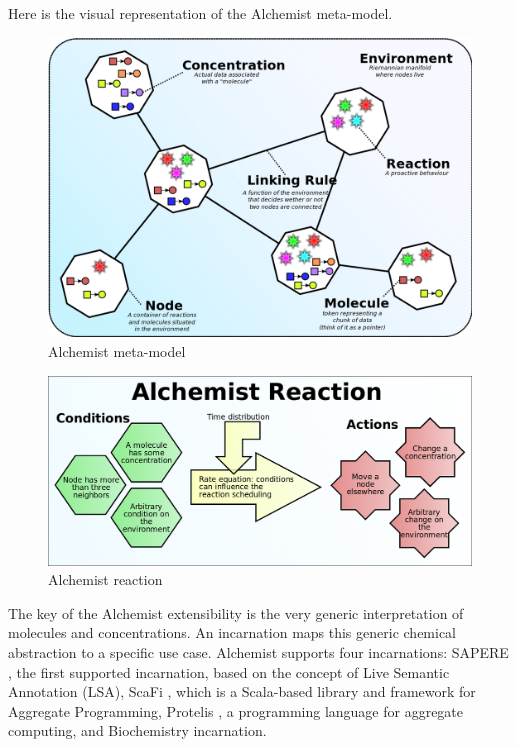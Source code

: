 \documentclass[12pt,a4paper,openright,twoside]{book}
\begin{document}
Here is the visual representation of the Alchemist meta-model.

\begin{figure}[H]
  \centering
  \includegraphics[width=\textwidth]{figures/alchemist-model.png}
  \caption{Alchemist meta-model}
\end{figure}

\begin{figure}[H]
  \centering
  \includegraphics[width=\textwidth]{figures/alchemist-reaction.png}
  \caption{Alchemist reaction}
\end{figure}

The key of the Alchemist extensibility is the very generic interpretation of molecules and concentrations. An incarnation maps this generic chemical abstraction to a specific use case.
Alchemist supports four incarnations: 
SAPERE \cite{DBLP:conf/saso/CastelliMRZ11}, the first supported incarnation, based on the concept of Live Semantic Annotation (LSA), 
ScaFi \cite{DBLP:journals/softx/CasadeiVAP22}, which is a Scala-based library and framework for Aggregate Programming, 
Protelis \cite{DBLP:conf/sac/PianiniVB15}, a programming language for aggregate computing, and 
Biochemistry incarnation.
\end{document}
